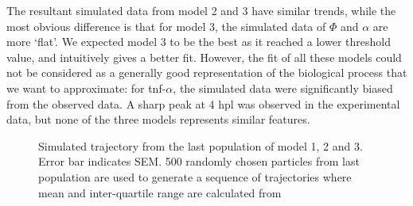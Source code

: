 The resultant simulated data from model 2 and 3 have similar trends, while the most obvious difference is that for model 3, the simulated data of $\Phi$ and $\alpha$ are more `flat'. We expected model 3 to be the best as it reached a lower threshold value, and intuitively gives a better fit. However, the fit of all these models could not be considered as a generally good representation of the biological process that we want to approximate: for tnf-$\alpha$, the simulated data were significantly biased from the observed data. A sharp peak at 4 hpl was observed in the experimental data, but none of the three models represents similar features.

\begin{figure}
    \begin{center}
    \end{center}

    \caption[Simulated trajectory from the 20th population of model 1, 2 and 3]%
    {Simulated trajectory from the last population of model 1, 2 and 3. Error bar indicates SEM. 500 randomly chosen particles from last population are used to generate a sequence of trajectories where mean and inter-quartile range are calculated from}
    \label{fig:result123}


    \vspace*{\floatsep}



\end{figure}
